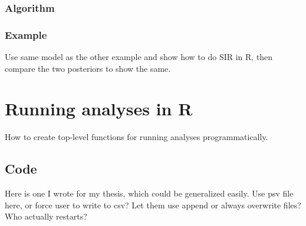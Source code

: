 \documentclass{article}
\begin{document}
\subsubsection{Algorithm}
\subsubsection{Example}
Use same model as the other example and show how to do SIR in R,
then compare the two posteriors to show the same.
\section{Running analyses in R}
How to create top-level functions for running analyses
programmatically.
\subsection{Code}
Here is one I wrote for my thesis, which could be generalized
easily. Use psv file here, or force user to write to csv? Let
them use append or always overwrite files? Who actually restarts?
\end{document}
